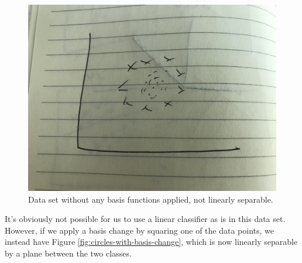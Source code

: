 \begin{figure}
    \centering
    \includegraphics[width=0.5\paperwidth]{../Classification/fig/circles_without_basis_change.jpg}
    \caption{Data set without any basis functions applied, not linearly separable.}
    \label{fig:circles-without-basis-change}
\end{figure}

It's obviously not possible for us to use a linear classifier as is in this data set. However, if we apply a basis change by squaring one of the data points, we instead have Figure \ref{fig:circles-with-basis-change}, which is now linearly separable by a plane between the two classes.

